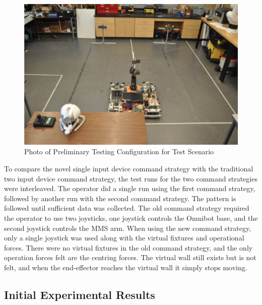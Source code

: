 \documentclass[onecolumn,10pt,final]{asme2ej}
\begin{document}
\begin{figure}[htbp!]
    \centering
    \includegraphics[width=\textwidth]{test1.png}
    \caption{Photo of Preliminary Testing Configuration for Test Scenario}
    \label{fig:setuptest}
\end{figure} 

To compare the novel single input device command strategy with the traditional two input device command strategy, the test runs for the two command strategies were interleaved. The operator did a single run using the first command strategy, followed by another run with the second command strategy. The pattern is followed until sufficient data was collected. The old command strategy required the operator to use two joysticks, one joystick controls the Omnibot base, and the second joystick controls the MMS arm. When using the new command strategy, only a single joystick was used along with the virtual fixtures and operational forces. There were no virtual fixtures in the old command strategy, and the only operation forces felt are the centring forces. The virtual wall still exists but is not felt, and when the end-effector reaches the virtual wall it simply stops moving.\\

\subsection{Initial Experimental Results}
\end{document}

